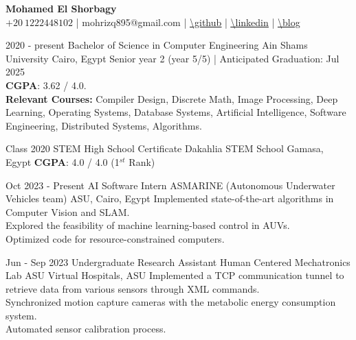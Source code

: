 \documentclass[hidelinks]{report}
\begin{document}
\begin{center}
    \noindent \Huge{ \selectfont \bfseries Mohamed El Shorbagy}\\[.4em]
    \large
    $+20 \ 1222448102$           |
    mohrizq895@gmail.com         | 
    \underline{\url{\github}}    |
    \underline{\url{\linkedin}}  |
    \underline{\url{\blog}}  
\end{center}


\vspace{2mm}

\large 
{}

\entry
    {2020 - present} 
    {Bachelor of Science in Computer Engineering }
    {Ain Shams University}
    {Cairo, Egypt  }
    {\textbullet Senior year 2 (year 5/5) | Anticipated Graduation: Jul 2025 \\ 
     \textbullet \textbf{CGPA}: 3.62 / 4.0. \\  
     \textbullet \textbf{Relevant Courses:} Compiler Design, Discrete Math, Image Processing, Deep Learning,
     Operating Systems, Database Systems, Artificial Intelligence, Software Engineering, Distributed Systems, 
     Algorithms. 
    }  

\entry
    {Class 2020}
    {STEM High School Certificate}
    {Dakahlia STEM School}
    {Gamasa, Egypt}
    {
    \textbullet \textbf{CGPA}: 4.0 / 4.0 (1$^{st}$ Rank)
    }

\vspace{2mm}


\entry
    {Oct 2023 - Present }
    {AI Software Intern}
    {ASMARINE (Autonomous Underwater Vehicles team)}
    {ASU, Cairo, Egypt}
    {
      \textbullet Implemented state-of-the-art algorithms in Computer Vision and SLAM. \\
      \textbullet Explored the feasibility of machine learning-based control in AUVs. \\
      \textbullet Optimized code for resource-constrained computers.
    }

\entry
    {Jun - Sep 2023}
    {Undergraduate Research Assistant}
    {Human Centered Mechatronics Lab}
    {ASU Virtual Hospitals, ASU}
    {
      \textbullet Implemented a TCP communication tunnel to retrieve data from various sensors through XML commands. \\
      \textbullet Synchronized motion capture cameras with the metabolic energy consumption system. \\
      \textbullet Automated sensor calibration process.
    }
\end{document}
